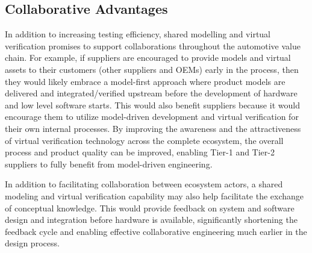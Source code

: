 \subsection{Collaborative Advantages}
In addition to increasing testing efficiency,
shared modelling and virtual verification promises to support collaborations throughout the automotive value chain.
%
%
For example, if suppliers are encouraged to provide models and virtual assets to their customers (other suppliers and OEMs) early in the  process,
then they would likely embrace a model-first
approach where product models are delivered and integrated/verified upstream before the development of hardware and low level software starts.
This would also benefit suppliers because it would encourage them to utilize model-driven development and virtual verification for their own internal processes.
By improving the awareness and the attractiveness of virtual verification technology across the complete ecosystem, the overall process and product quality can be improved, enabling Tier-1 and Tier-2 suppliers to fully benefit from model-driven engineering.

In addition to facilitating collaboration between ecosystem actors, a shared modeling and virtual verification capability may also help facilitate the exchange of conceptual knowledge. This would provide feedback on system and software design and integration before hardware is available, significantly shortening the feedback cycle and enabling effective collaborative engineering much earlier in the design process.


